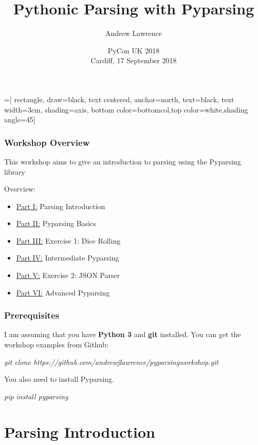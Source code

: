 \documentclass{beamer}
\title[Pythonic Parsing with Pyparsing]{Pythonic Parsing with Pyparsing}
\author[Andrew Lawrence]{Andrew Lawrence}
\date[PyCon UK, 17 September 2018]{PyCon UK 2018\\[1em]  Cardiff, 17 September 2018}
\begin{document}
=[
    rectangle,
    draw=black,
    text centered,
    anchor=north,
    text=black,
    text width=3cm,
    shading=axis,
    bottom color=bottomcol,top color=white,shading angle=45]


\begin{frame}
  \titlepage
\end{frame}



\begin{frame}

\frametitle{Workshop Overview}

\medskip
This workshop aims to give an introduction to parsing using the Pyparsing library

\medskip

Overview:

\begin{itemize}
  \item \underline{Part I:} Parsing Introduction
  \item \underline{Part II:} Pyparsing Basics
  \item \underline{Part III:} Exercise 1: Dice Rolling
  \item \underline{Part IV:} Intermediate Pyparsing
  \item \underline{Part V:} Exercise 2: JSON Parser
  \item \underline{Part VI:} Advanced Pyparsing
\end{itemize}

\end{frame}

\begin{frame}

\frametitle{Prerequisites}
I am assuming that you have \textbf{Python 3} and \textbf{git} installed. You can get the workshop examples from Github:
\begin{center}
\textit{git clone https://github.com/andrewjlawrence/pyparsingworkshop.git}
\end{center}
\bigskip
You also need to install Pyparsing. 
\begin{center}
\textit{pip install pyparsing}
\end{center}
\end{frame}

\section{Parsing Introduction}

\end{document}
